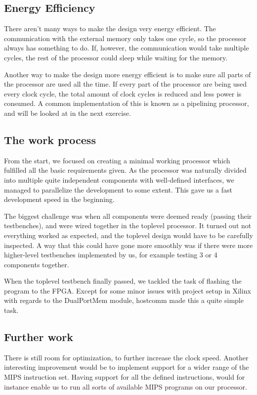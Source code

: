 \subsection{Energy Efficiency}
There aren't many ways to make the design very energy efficient.
The communication with the external memory only takes one cycle, so the processor always has something to do.
If, however, the communication would take multiple cycles, the rest of the processor could sleep while waiting for the memory.

Another way to make the design more energy efficient is to make sure all parts of the processor are used all the time.
If every part of the processor are being used every clock cycle,
the total amount of clock cycles is reduced and less power is consumed.
A common implementation of this is known as a pipelining processor, and will be looked at in the next exercise.

\subsection{The work process}

From the start, we focused on creating a minimal working processor which fulfilled all the basic requirements given.
As the processor was naturally divided into multiple quite independent components with well-defined interfaces, we managed to parallelize the development to some extent.
This gave us a fast development speed in the beginning.

The biggest challenge was when all components were deemed ready (passing their testbenches), and were wired together in the toplevel processor.
It turned out not everything worked as expected, and the toplevel design would have to be carefully inspected.
A way that this could have gone more smoothly was if there were more higher-level testbenches implemented by us, for example testing 3 or 4 components together.

When the toplevel testbench finally passed, we tackled the task of flashing the program to the FPGA.
Except for some minor issues with project setup in Xilinx with regards to the DualPortMem module, hostcomm made this a quite simple task.

\subsection{Further work}

There is still room for optimization, to further increase the clock speed.
Another interesting improvement would be to implement support for a wider range of the MIPS instruction set.
Having support for all the defined instructions, would for instance enable us to run all sorts of available MIPS programs on our processor.
